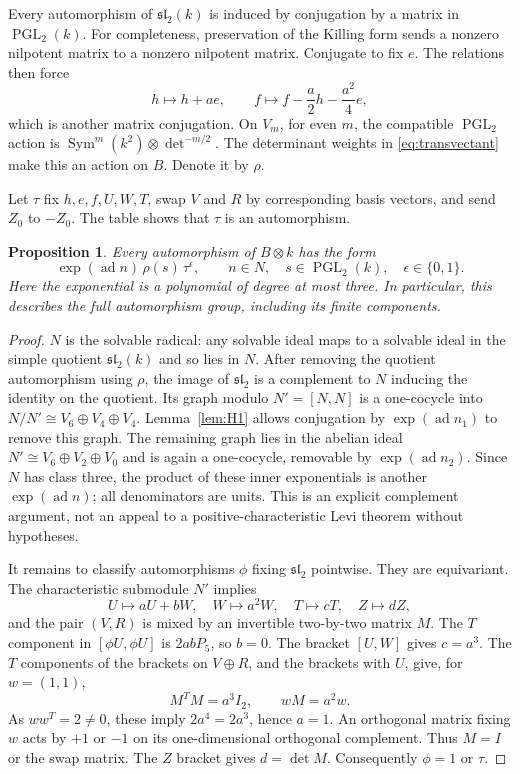 \documentclass[11pt]{article}
\newtheorem{proposition}[theorem]{Proposition}
\theoremstyle{definition}\newtheorem{definition}[theorem]{Definition}
\theoremstyle{remark}\newtheorem{remark}[theorem]{Remark}
\DeclareMathOperator{\ad}{ad}
\DeclareMathOperator{\PGL}{PGL}
\begin{document}
Every automorphism of $\mathfrak{sl}_2(k)$ is induced by conjugation by a
matrix in $\PGL_2(k)$. For completeness, preservation of the Killing form
sends a nonzero nilpotent matrix to a nonzero nilpotent matrix. Conjugate to
fix $e$. The relations then force
\[
 h\mapsto h+a e,\qquad f\mapsto f-\frac a2h-\frac{a^2}{4}e,
\]
which is another matrix conjugation. On $V_m$, for even $m$, the compatible
$\PGL_2$ action is $\operatorname{Sym}^m(k^2)\otimes\det^{-m/2}$.
The determinant weights in \eqref{eq:transvectant} make this an action on $B$.
Denote it by $\rho$.

Let $\tau$ fix $h,e,f,U,W,T$, swap $V$ and $R$ by corresponding basis
vectors, and send $Z_0$ to $-Z_0$. The table shows that $\tau$ is an
automorphism.

\begin{proposition}\label{prop:autB}
Every automorphism of $B\otimes k$ has the form
\begin{equation}\label{eq:autB}
 \exp(\ad n)\,\rho(s)\,\tau^\epsilon,
 \qquad n\in N,\quad s\in\PGL_2(k),\quad \epsilon\in\{0,1\}.
\end{equation}
Here the exponential is a polynomial of degree at most three. In particular,
this describes the full automorphism group, including its finite components.
\end{proposition}
\begin{proof}
$N$ is the solvable radical: any solvable ideal maps to a solvable ideal in
the simple quotient $\mathfrak{sl}_2(k)$ and so lies in $N$.
After removing the quotient automorphism using $\rho$, the image of
$\mathfrak{sl}_2$ is a complement to $N$ inducing the identity on the quotient.
Its graph modulo $N'=[N,N]$ is a one-cocycle into
$N/N'\cong V_6\oplus V_4\oplus V_4$.
Lemma~\ref{lem:H1} allows conjugation by $\exp(\ad n_1)$ to remove this
graph. The remaining graph lies in the abelian ideal
$N'\cong V_6\oplus V_2\oplus V_0$ and is again a one-cocycle, removable by
$\exp(\ad n_2)$. Since $N$ has class three, the product of these inner
exponentials is another $\exp(\ad n)$; all denominators are units.
This is an explicit complement argument, not an appeal to a
positive-characteristic Levi theorem without hypotheses.

It remains to classify automorphisms $\phi$ fixing $\mathfrak{sl}_2$ pointwise.
They are equivariant. The characteristic submodule $N'$ implies
\[
 U\mapsto aU+bW,\quad W\mapsto a^2W,\quad T\mapsto cT,
 \quad Z\mapsto dZ,
\]
and the pair $(V,R)$ is mixed by an invertible two-by-two matrix $M$.
The $T$ component in $[\phi U,\phi U]$ is $2abP_5$, so $b=0$.
The bracket $[U,W]$ gives $c=a^3$. The $T$ components of the brackets on
$V\oplus R$, and the brackets with $U$, give, for $w=(1,1)$,
\begin{equation}\label{eq:block}
 M^T M=a^3 I_2,\qquad wM=a^2w.
\end{equation}
As $ww^T=2\ne0$, these imply $2a^4=2a^3$, hence $a=1$.
An orthogonal matrix fixing $w$ acts by $+1$ or $-1$ on its one-dimensional
orthogonal complement. Thus $M=I$ or the swap matrix. The $Z$ bracket gives
$d=\det M$. Consequently $\phi=1$ or $\tau$.
\end{proof}
\end{document}

